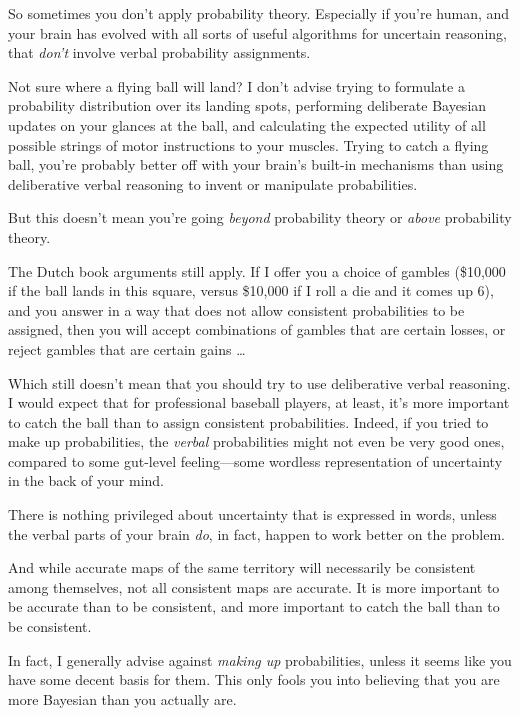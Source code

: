 {
 So sometimes you don't apply probability theory.
Especially if you're human, and your brain has evolved
with all sorts of useful algorithms for uncertain reasoning, that
\textit{don't} involve verbal probability assignments.}

{
 Not sure where a flying ball will land? I don't
advise trying to formulate a probability distribution over its landing
spots, performing deliberate Bayesian updates on your glances at the
ball, and calculating the expected utility of all possible strings of
motor instructions to your muscles. Trying to catch a flying ball,
you're probably better off with your
brain's built-in mechanisms than using deliberative
verbal reasoning to invent or manipulate probabilities.}

{
 But this doesn't mean you're going
\textit{beyond} probability theory or \textit{above} probability
theory.}

{
 The Dutch book arguments still apply. If I offer you a choice of
gambles (\$10,000 if the ball lands in this square, versus \$10,000 if
I roll a die and it comes up 6), and you answer in a way that does not
allow consistent probabilities to be assigned, then you will accept
combinations of gambles that are certain losses, or reject gambles that
are certain gains \ldots}

{
 Which still doesn't mean that you should try to
use deliberative verbal reasoning. I would expect that for professional
baseball players, at least, it's more important to
catch the ball than to assign consistent probabilities. Indeed, if you
tried to make up probabilities, the \textit{verbal} probabilities might
not even be very good ones, compared to some gut-level feeling---some
wordless representation of uncertainty in the back of your mind.}

{
 There is nothing privileged about uncertainty that is expressed in
words, unless the verbal parts of your brain \textit{do}, in fact,
happen to work better on the problem.}

{
 And while accurate maps of the same territory will necessarily be
consistent among themselves, not all consistent maps are accurate. It
is more important to be accurate than to be consistent, and more
important to catch the ball than to be consistent.}

{
 In fact, I generally advise against \textit{making up}
probabilities, unless it seems like you have some decent basis for
them. This only fools you into believing that you are more Bayesian
than you actually are.}

